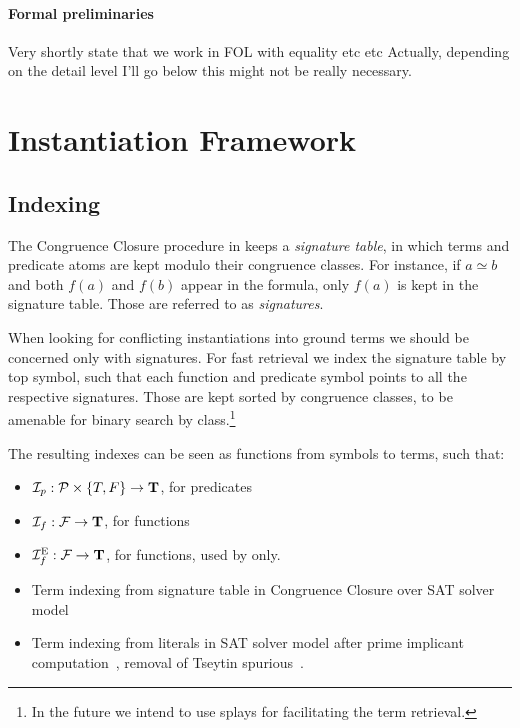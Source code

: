 \message{ !name(main.tex)}\documentclass{easychair}
\begin{document}
\paragraph{Formal preliminaries} Very shortly state that we work in
FOL with equality etc etc Actually, depending on the detail level I'll
go below this might not be really necessary.

\section{Instantiation Framework}
\label{sec:inst-framework}



\subsection{Indexing}
\label{sec:inst-indexing}



The Congruence Closure procedure in {\verit} keeps a \emph{signature
  table}, in which terms and predicate atoms are kept modulo their
congruence classes. For instance, if $a\simeq b$ and both $f(a)$ and
$f(b)$ appear in the formula, only $f(a)$ is kept in the signature
table. Those are referred to as \emph{signatures}.

When looking for conflicting instantiations into ground terms we
should be concerned only with signatures. For fast retrieval we index
the signature table by top symbol, such that each function and
predicate symbol points to all the respective signatures. Those are
kept sorted by congruence classes, to be amenable for binary search
by class.\footnote{In the future we intend to use splays for
  facilitating the term retrieval.}

The resulting indexes can be seen as functions from symbols to terms,
such that:

\begin{itemize}[label={}]
  \item $\mathcal{I}_p: \mathcal{P}\times\{T,F\}\rightarrow \mathbf{T}$, for predicates
  \item $\mathcal{I}_f: \mathcal{F}\rightarrow \mathbf{T}$, for functions
  \item $\mathcal{I}_f^{\text{E}}: \mathcal{F}\rightarrow \mathbf{T}$, for functions,
  used by {\ematch} only.
\end{itemize}



\begin{itemize}
  \item Term indexing from signature table in Congruence Closure over SAT solver model
  \item Term indexing from literals in SAT solver model after prime
  implicant computation~\cite{Deharbe2013}, removal of Tseytin
  spurious~\cite{deMoura2007}.
\end{itemize}
\end{document}
